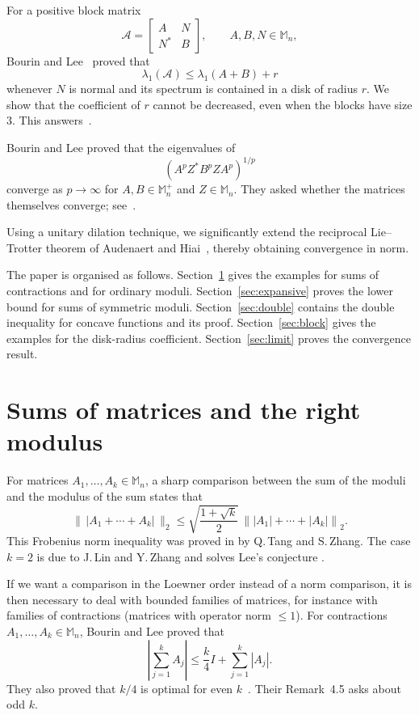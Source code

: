 \documentclass[11pt]{amsart}
\numberwithin{equation}{section}
\newcommand{\Mn}{\mathbb M_n}
\newcommand{\Mnp}{\mathbb M_n^+}
\begin{document}
For a positive block matrix
\[
 \mathcal A=
 \begin{bmatrix}A&N\\N^*&B\end{bmatrix},
 \qquad A,B,N\in\Mn,
\]
Bourin and Lee~\cite[Corollary~2.4]{BourinLee2022} proved that
\[
 \lambda_1(\mathcal A)\leq\lambda_1(A+B)+r
\]
whenever $N$ is normal and its spectrum is contained in a disk
of radius $r$. We show that the coefficient of $r$ cannot be
decreased, even when the blocks have size $3$.
This answers~\cite[Question~2.5]{BourinLee2022}.

Bourin and Lee proved that the eigenvalues of
\[
 (A^pZ^*B^pZA^p)^{1/p}
\]
converge as $p\to\infty$ for $A,B\in\Mnp$ and $Z\in\Mn$.
They asked whether the matrices themselves converge;
see~\cite[Corollary~2.6 and the paragraph following it]{BourinLee2016}.

Using a unitary dilation technique, we significantly extend the
reciprocal Lie--Trotter theorem of Audenaert and Hiai~\cite{AudenaertHiai},
thereby obtaining convergence in norm.


The paper is organised as follows.
Section~\ref{sec:contractions} gives the examples for sums
of contractions and for ordinary moduli.
Section~\ref{sec:expansive} proves the lower bound for sums
of symmetric moduli.
Section~\ref{sec:double} contains the double inequality for
concave functions and its proof.
Section~\ref{sec:block} gives the examples for the
disk-radius coefficient.
Section~\ref{sec:limit} proves the convergence result.


\section{Sums of matrices and the right modulus}
\label{sec:contractions}

For  matrices $A_1,\ldots,A_k\in\Mn$, a sharp comparison  between the sum of the moduli and the modulus of the sum    states that
\begin{equation}\label{frobenius}
\| \, |A_1+\cdots + A_k|\, \|_2 \le \sqrt{\frac{1+\sqrt{k}}{2}} \, \left\| |A_1|+\cdots +|A_k|\right\|_2.
\end{equation}
This Frobenius norm inequality was proved in \cite{TaZ26} by Q.\,Tang and S.\,Zhang.  The case $k=2$ is due to J.\,Lin and Y.\,Zhang \cite{LZ22} and solves Lee's conjecture \cite{Lee10}.

If we want a comparison in the Loewner order instead of a norm comparison, it is then necessary to deal with bounded families of matrices, for instance with families of contractions (matrices with operator norm $\le1$).  For   contractions $A_1,\ldots,A_k\in\Mn$, Bourin and Lee proved that
\begin{equation}\label{eq:BL-contractions}
 \left|\sum_{j=1}^k A_j\right|
 \leq\frac{k}{4}I+\sum_{j=1}^k|A_j|.
\end{equation}
They also proved that $k/4$ is optimal for even $k$~\cite[Corollary~4.4]{BourinLee2024}. Their Remark~4.5 asks about odd $k$.
\end{document}
